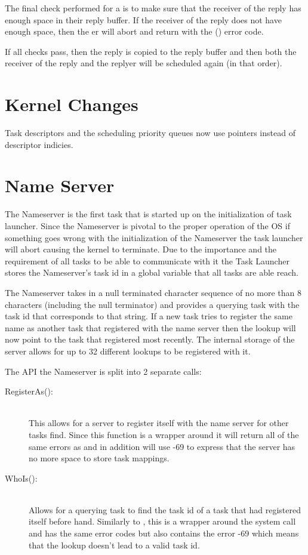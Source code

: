 \documentclass[pdftex,10pt,a4paper]{article}
\begin{document}
The final check performed for a  is to make sure that the
receiver of the reply has enough space in their reply buffer. If the
receiver of the reply does not have enough space, then the
er will abort and return with the 
() error code.

If all checks pass, then the reply is copied to the reply buffer and
then both the receiver of the reply and the replyer will be scheduled
again (in that order).

\section*{Kernel Changes}

Task descriptors and the scheduling priority queues now use pointers
instead of descriptor indicies.


\section*{Name Server}

The Nameserver is the first task that is started up on the
initialization of task launcher. Since the Nameserver is pivotal to
the proper operation of the OS if something goes wrong with the
initialization of the Nameserver the task launcher will abort causing
the kernel to terminate. Due to the importance and the requirement of
all tasks to be able to communicate with it the Task Launcher stores
the Nameserver’s task id in a global variable that all tasks are able
reach.

The Nameserver takes in a null terminated character sequence of no
more than 8 characters (including the null terminator) and provides a
querying task with the task id that corresponds to that string. If a
new task tries to register the same name as another task that
registered with the name server then the lookup will now point to the
task that registered most recently. The internal storage of the server
allows for up to 32 different lookups to be registered with it.

The API the Nameserver is split into 2 separate calls:
\begin{description}
\item[RegisterAs():] \hfill \\
This allows for a server to register itself with the name server for
other tasks find. Since this function is a wrapper around 
it will return all of the same errors as  and in addition
will use -69 to express that the server has no more space to store
task mappings.

\item[WhoIs():] \hfill \\
Allows for a querying task to find the task id of a task that had
registered itself before hand. Similarly to , this
is a wrapper around the  system call and has the same
error codes but also contains the error -69 which means that the
lookup doesn’t lead to a valid task id.
\end{description}
\end{document}
